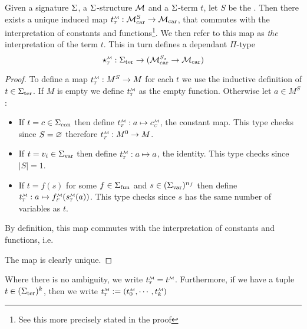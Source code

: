 \begin{dfn}
    Given a signature $\Sigma$, 
    a $\Sigma$-structure $\mathcal{M}$ and a $\Sigma$-term $t$,
    let $S$ be the 
    .
    Then there exists a unique induced map 
    $\subintp{T}{\MM}{t} : \carrier{\MM}^S \to \carrier{\MM}$, 
    that commutes with the interpretation of constants and
    functions\footnote{See this more precisely stated in the proof}.
    We then refer to this map as \emph{the} interpretation of the term $t$.
    This in turn defines a dependant $\Pi$-type  
    \[
        \intp{T}{\MM}: 
        \term{\Si} \to (\carrier{\MM}^{S_\star} \to \carrier{\MM})
    \]
\end{dfn}
\begin{proof}
    To define a map $\subintp{T}{\MM}{t} : M^S \to M$ for each
    $t$ we use the inductive definition of $t \in {\Sigma}_\mathrm{ter}$.
    If $M$ is empty we define $\subintp{T}{\MM}{t}$ as the empty function.
    Otherwise let $a \in M^S$:
    \begin{itemize} 
        \item If $t = c \in {\Sigma}_\mathrm{con}$ then define 
        $\subintp{T}{\MM}{t} : a \mapsto \subintp{C}{\MM}{c}$, 
        the constant map.
        This type checks since $S = \varnothing$ 
        therefore $\subintp{T}{\MM}{t} : M^0 \to M$.
        \item If $t = v_i \in {\Sigma}_\mathrm{var}$
        then define $\subintp{T}{\MM}{t} : a \mapsto a$, the identity.
        This type checks since $|S| = 1$.
        \item If $t = f(s)$ for some $f \in {\Sigma}_\mathrm{fun}$ and 
        $s \in ({\Sigma}_\mathrm{var})^{n_f}$ then define 
        $\subintp{T}{\MM}{t} : 
        a \mapsto \subintp{F}{\MM}{f}(\subintp{T}{\MM}{s}(a))$.
        This type checks since $s$ has the same number of variables as $t$.
    \end{itemize}
    By definition, 
    this map commutes with the interpretation of constants and functions, i.e.
    \begin{center}
    \end{center}
    The map is clearly unique.
\end{proof}
Where there is no ambiguity, 
we write $\subintp{T}{\MM}{t} = \modintp{\MM}{t}$.
Furthermore, if we have a tuple 
$t \in ({\Sigma}_\mathrm{ter})^k$,
then we write $\subintp{T}{\MM}{t}:= 
(\mmintp{t_0},\cdots,\mmintp{t_k})$
    
